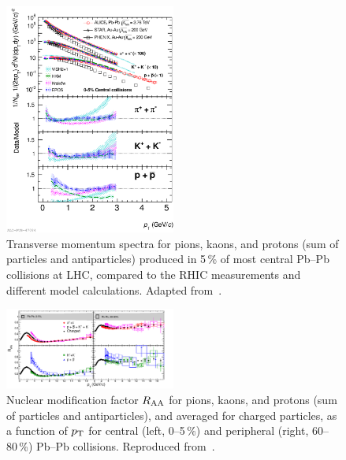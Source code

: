 \begin{figure}
\centering
\includegraphics[width=0.5\textwidth]{ksfigures/IdentPartSpec.pdf}
\caption{Transverse momentum spectra for pions, kaons, and protons (sum of particles and antiparticles) produced in 5\,\% of most central Pb--Pb collisions at LHC, compared to the RHIC measurements and different model calculations. Adapted from~\cite{Abelev:2012wca}.}
\label{figks:IdentPartSpec}
\end{figure}

\begin{figure}
\centering
\includegraphics[width=0.5\textwidth]{ksfigures/IdentHighPtRAA.pdf}
\caption{Nuclear modification factor $R_{\rm AA}$ for pions, kaons, and protons (sum of particles and antiparticles), and averaged for charged particles, as a function of $p_{\rm T}$ for central (left, 0--5\,\%) and peripheral (right, 60--80\,\%) Pb--Pb collisions. Reproduced from~\cite{ALICEIdentHighPtRAA}.}
\label{figks:IdentPartRAA}
\end{figure}

